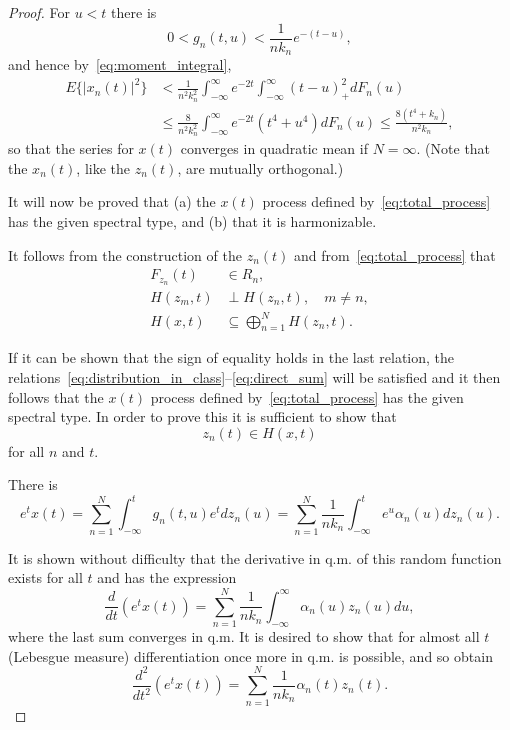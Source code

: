 \documentclass[11pt]{article}
\begin{document}
\begin{proof}
For $u < t$ there is
\begin{equation}
0 < g_n(t, u) < \frac{1}{nk_n} e^{-(t-u)},
\label{eq:kernel_bound}
\end{equation}
and hence by~\eqref{eq:moment_integral},
\begin{align}
E\{|x_n(t)|^2\} &< \frac{1}{n^2k_n^2} \int_{-\infty}^{\infty} e^{-2t} \int_{-\infty}^{\infty} (t-u)^2_+ dF_n(u) \nonumber \\
&\leq \frac{8}{n^2k_n^2} \int_{-\infty}^{\infty} e^{-2t} (t^4 + u^4) dF_n(u) \leq \frac{8(t^4 + k_n)}{n^2k_n}, \label{eq:moment_bound}
\end{align}
so that the series for $x(t)$ converges in quadratic mean if $N = \infty$. (Note that the $x_n(t)$, like the $z_n(t)$, are mutually orthogonal.)

It will now be proved that (a) the $x(t)$ process defined by~\eqref{eq:total_process} has the given spectral type, and (b) that it is harmonizable.

It follows from the construction of the $z_n(t)$ and from~\eqref{eq:total_process} that
\begin{align}
F_{z_n}(t) &\in R_n, \label{eq:type_condition_a}\\
H(z_m, t) &\perp H(z_n, t), \quad m \neq n, \label{eq:type_condition_b}\\
H(x, t) &\subseteq \bigoplus_{n=1}^N H(z_n, t). \label{eq:type_condition_c}
\end{align}

If it can be shown that the sign of equality holds in the last relation, the relations~\eqref{eq:distribution_in_class}--\eqref{eq:direct_sum} will be satisfied and it then follows that the $x(t)$ process defined by~\eqref{eq:total_process} has the given spectral type. In order to prove this it is sufficient to show that
\begin{equation}
z_n(t) \in H(x, t)
\label{eq:innovation_in_space}
\end{equation}
for all $n$ and $t$.

There is
\begin{equation}
e^t x(t) = \sum_{n=1}^N \int_{-\infty}^t g_n(t, u) e^t dz_n(u) = \sum_{n=1}^N \frac{1}{nk_n} \int_{-\infty}^t e^u \alpha_n(u) dz_n(u).
\label{eq:exponential_process}
\end{equation}

It is shown without difficulty that the derivative in q.m. of this random function exists for all $t$ and has the expression
\begin{equation}
\frac{d}{dt}(e^t x(t)) = \sum_{n=1}^N \frac{1}{nk_n} \int_{-\infty}^{\infty} \alpha_n(u) z_n(u) du,
\label{eq:first_derivative}
\end{equation}
where the last sum converges in q.m. It is desired to show that for almost all $t$ (Lebesgue measure) differentiation once more in q.m. is possible, and so obtain
\begin{equation}
\frac{d^2}{dt^2}(e^t x(t)) = \sum_{n=1}^N \frac{1}{nk_n} \alpha_n(t) z_n(t).
\label{eq:second_derivative}
\end{equation}


\end{proof}
\end{document}
